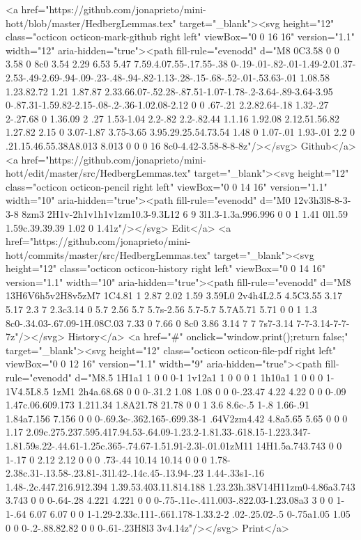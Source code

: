       <a href="https://github.com/jonaprieto/mini-hott/blob/master/HedbergLemmas.tex" target="_blank"><svg height="12" class="octicon octicon-mark-github right left" viewBox="0 0 16 16" version="1.1" width="12" aria-hidden="true"><path fill-rule="evenodd" d="M8 0C3.58 0 0 3.58 0 8c0 3.54 2.29 6.53 5.47 7.59.4.07.55-.17.55-.38 0-.19-.01-.82-.01-1.49-2.01.37-2.53-.49-2.69-.94-.09-.23-.48-.94-.82-1.13-.28-.15-.68-.52-.01-.53.63-.01 1.08.58 1.23.82.72 1.21 1.87.87 2.33.66.07-.52.28-.87.51-1.07-1.78-.2-3.64-.89-3.64-3.95 0-.87.31-1.59.82-2.15-.08-.2-.36-1.02.08-2.12 0 0 .67-.21 2.2.82.64-.18 1.32-.27 2-.27.68 0 1.36.09 2 .27 1.53-1.04 2.2-.82 2.2-.82.44 1.1.16 1.92.08 2.12.51.56.82 1.27.82 2.15 0 3.07-1.87 3.75-3.65 3.95.29.25.54.73.54 1.48 0 1.07-.01 1.93-.01 2.2 0 .21.15.46.55.38A8.013 8.013 0 0 0 16 8c0-4.42-3.58-8-8-8z"/></svg> Github</a>
      <a href="https://github.com/jonaprieto/mini-hott/edit/master/src/HedbergLemmas.tex" target="_blank"><svg height="12" class="octicon octicon-pencil right left" viewBox="0 0 14 16" version="1.1" width="10" aria-hidden="true"><path fill-rule="evenodd" d="M0 12v3h3l8-8-3-3-8 8zm3 2H1v-2h1v1h1v1zm10.3-9.3L12 6 9 3l1.3-1.3a.996.996 0 0 1 1.41 0l1.59 1.59c.39.39.39 1.02 0 1.41z"/></svg> Edit</a>
      <a href="https://github.com/jonaprieto/mini-hott/commits/master/src/HedbergLemmas.tex" target="_blank"><svg height="12" class="octicon octicon-history right left" viewBox="0 0 14 16" version="1.1" width="10" aria-hidden="true"><path fill-rule="evenodd" d="M8 13H6V6h5v2H8v5zM7 1C4.81 1 2.87 2.02 1.59 3.59L0 2v4h4L2.5 4.5C3.55 3.17 5.17 2.3 7 2.3c3.14 0 5.7 2.56 5.7 5.7s-2.56 5.7-5.7 5.7A5.71 5.71 0 0 1 1.3 8c0-.34.03-.67.09-1H.08C.03 7.33 0 7.66 0 8c0 3.86 3.14 7 7 7s7-3.14 7-7-3.14-7-7-7z"/></svg> History</a>
      <a  href="#" onclick="window.print();return false;" target="_blank"><svg height="12" class="octicon octicon-file-pdf right left" viewBox="0 0 12 16" version="1.1" width="9" aria-hidden="true"><path fill-rule="evenodd" d="M8.5 1H1a1 1 0 0 0-1 1v12a1 1 0 0 0 1 1h10a1 1 0 0 0 1-1V4.5L8.5 1zM1 2h4a.68.68 0 0 0-.31.2 1.08 1.08 0 0 0-.23.47 4.22 4.22 0 0 0-.09 1.47c.06.609.173 1.211.34 1.8A21.78 21.78 0 0 1 3.6 8.6c-.5 1-.8 1.66-.91 1.84a7.156 7.156 0 0 0-.69.3c-.362.165-.699.38-1 .64V2zm4.42 4.8a5.65 5.65 0 0 0 1.17 2.09c.275.237.595.417.94.53-.64.09-1.23.2-1.81.33-.618.15-1.223.347-1.81.59s.22-.44.61-1.25c.365-.74.67-1.51.91-2.3l-.01.01zM11 14H1.5a.743.743 0 0 1-.17 0 2.12 2.12 0 0 0 .73-.44 10.14 10.14 0 0 0 1.78-2.38c.31-.13.58-.23.81-.31l.42-.14c.45-.13.94-.23 1.44-.33s1-.16 1.48-.2c.447.216.912.394 1.39.53.403.11.814.188 1.23.23h.38V14H11zm0-4.86a3.743 3.743 0 0 0-.64-.28 4.221 4.221 0 0 0-.75-.11c-.411.003-.822.03-1.23.08a3 3 0 0 1-1-.64 6.07 6.07 0 0 1-1.29-2.33c.111-.661.178-1.33.2-2 .02-.25.02-.5 0-.75a1.05 1.05 0 0 0-.2-.88.82.82 0 0 0-.61-.23H8l3 3v4.14z"/></svg> Print</a>
